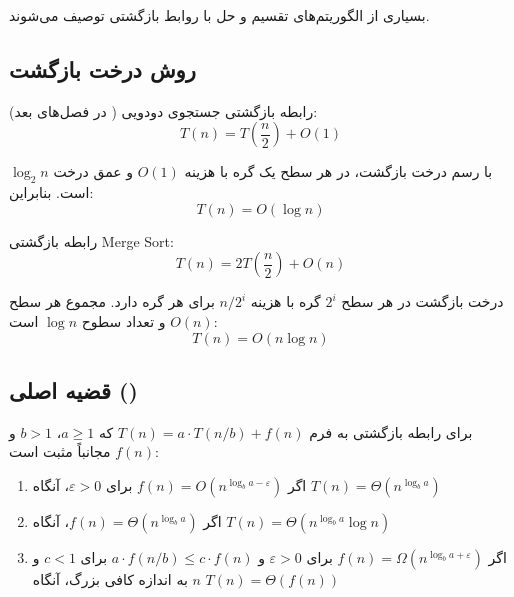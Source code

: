 \documentclass{matinbook}
\begin{document}
    بسیاری از الگوریتم‌های تقسیم و حل
    با روابط بازگشتی توصیف می‌شوند.
    
    \subsection{روش درخت بازگشت}
    
    \begin{example}
        رابطه بازگشتی جستجوی دودویی
        ( در فصل‌های بعد):
        \[
        T(n) = T\left(\frac{n}{2}\right) + O(1)
        \]
        
        با رسم درخت بازگشت، در هر سطح یک گره با هزینه $O(1)$
        و عمق درخت $\log_{2} n$ است. بنابراین:
        \[
        T(n) = O(\log n)
        \]
        \label{ex:binary-recursion}
    \end{example}
    
    \begin{example}
        رابطه بازگشتی Merge Sort:
        \[
        T(n) = 2T\left(\frac{n}{2}\right) + O(n)
        \]
        
        درخت بازگشت در هر سطح $2^{i}$ گره با هزینه
        $n/2^{i}$ برای هر گره دارد. مجموع هر سطح $O(n)$
        و تعداد سطوح $\log n$ است:
        \[
        T(n) = O(n \log n)
        \]
        \label{ex:merge-recursion}
    \end{example}
    
    \subsection{قضیه اصلی ()}
    
    \begin{theorem}
        برای رابطه بازگشتی به فرم
        $T(n) = a \cdot T(n/b) + f(n)$
        که $a \geq 1$، $b > 1$ و $f(n)$ مجانباً مثبت است:
        
        \begin{enumerate}
            \item اگر $f(n) = O(n^{\log_{b} a - \varepsilon})$
            برای $\varepsilon > 0$، آنگاه
            $T(n) = \Theta(n^{\log_{b} a})$
            
            \item اگر $f(n) = \Theta(n^{\log_{b} a})$، آنگاه
            $T(n) = \Theta(n^{\log_{b} a} \log n)$
            
            \item اگر $f(n) = \Omega(n^{\log_{b} a + \varepsilon})$
            برای $\varepsilon > 0$ و
            $a \cdot f(n/b) \leq c \cdot f(n)$
            برای $c < 1$ و $n$ به اندازه کافی بزرگ،
            آنگاه $T(n) = \Theta(f(n))$
        \end{enumerate}
        \label{thm:master-theorem}
    \end{theorem}
    
\end{document}
